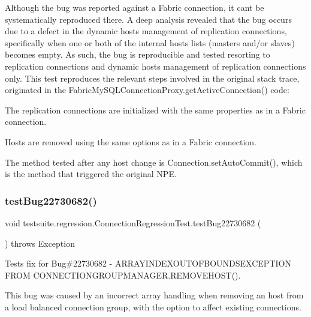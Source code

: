 Although the bug was reported against a Fabric connection, it can\textquotesingle{}t be systematically reproduced there. A deep analysis revealed that the bug occurs due to a defect in the dynamic hosts management of replication connections, specifically when one or both of the internal hosts lists (masters and/or slaves) becomes empty. As such, the bug is reproducible and tested resorting to replication connections and dynamic hosts management of replication connections only. This test reproduces the relevant steps involved in the original stack trace, originated in the Fabric\+My\+S\+Q\+L\+Connection\+Proxy.\+get\+Active\+Connection() code\+:
\begin{DoxyItemize}
\item The replication connections are initialized with the same properties as in a Fabric connection.
\item Hosts are removed using the same options as in a Fabric connection.
\item The method tested after any host change is Connection.\+set\+Auto\+Commit(), which is the method that triggered the original N\+PE. 
\end{DoxyItemize}\mbox{\label{classtestsuite_1_1regression_1_1_connection_regression_test_a415dfcfbf9a9c7542bc8defe119ee97c}} 
\subsubsection{\texorpdfstring{test\+Bug22730682()}{testBug22730682()}}
{\footnotesize\ttfamily void testsuite.\+regression.\+Connection\+Regression\+Test.\+test\+Bug22730682 (\begin{DoxyParamCaption}{ }\end{DoxyParamCaption}) throws Exception}

Tests fix for Bug\#22730682 -\/ A\+R\+R\+A\+Y\+I\+N\+D\+E\+X\+O\+U\+T\+O\+F\+B\+O\+U\+N\+D\+S\+E\+X\+C\+E\+P\+T\+I\+ON F\+R\+OM C\+O\+N\+N\+E\+C\+T\+I\+O\+N\+G\+R\+O\+U\+P\+M\+A\+N\+A\+G\+E\+R.\+R\+E\+M\+O\+V\+E\+H\+O\+S\+T().

This bug was caused by an incorrect array handling when removing an host from a load balanced connection group, with the option to affect existing connections. \mbox{\label{classtestsuite_1_1regression_1_1_connection_regression_test_a9c80414050a22a9ebafdb247f107d6f2}} 
